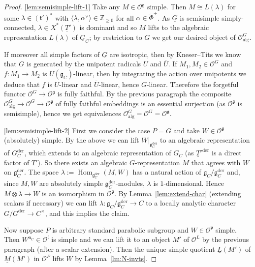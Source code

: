 \documentclass[a4paper]{amsart}
\numberwithin{equation}{section}
\theoremstyle{remark}
\theoremstyle{definition}
\DeclareMathOperator{\Hom}{Hom}
\newcommand{\Z}{\mathbb{Z}}
\newcommand{\alggrp}[1]{\underline{#1}}
\newcommand{\der}{\mathrm{der}}
\newcommand{\alg}{\mathrm{alg}}
\begin{document}
\begin{proof}
  \ref{lem:semisimple-lift-1} Take any $M \in \mathcal{O}^{\mathfrak{g}}$ simple.
  Then $M \cong L(\lambda)$ for some $\lambda \in (\mathfrak{t}')^*$ with $\langle\lambda,\alpha^{\vee}\rangle \in \Z_{\ge 0}$ for all $\alpha \in \widetilde{\Phi}^{+}$.
  As $\alggrp G$ is semisimple simply-connected, $\lambda \in X^*(\alggrp{T}')$ is dominant and so $M$ lifts to the algebraic representation $L(\lambda)$
  of $\alggrp G_{C}$; by restriction to $G$ we get our desired object of $\mathcal{O}_\alg^{G}$.

  If moreover all simple factors of $\alggrp{G}$ are isotropic, then by Kneser--Tits we know that $G$ is generated by the unipotent radicals
  $U$ and $\overline{U}$. If $M_1, M_2 \in \mathcal{O}^{G}$ and $f \colon M_1 \to M_2$ is $U(\mathfrak{g}_{C})$-linear, then by integrating the action over unipotents
  we deduce that $f$ is $U$-linear and $\overline{U}$-linear, hence $G$-linear. Therefore the forgetful functor $\mathcal{O}^{G} \to \mathcal{O}^{\mathfrak{g}}$ is fully faithful.
  By the previous paragraph the composite $\mathcal{O}_\alg^{G} \to \mathcal{O}^{G} \to \mathcal{O}^{\mathfrak{g}}$ of fully faithful embeddings is an essential surjection (as $\mathcal{O}^{\mathfrak{g}}$ is semisimple), hence we get equivalences $\mathcal{O}_\alg^{G} = \mathcal{O}^{G} = \mathcal{O}^{\mathfrak{g}}$.

  \ref{lem:semisimple-lift-2} First we consider the case $P = G$ and take $W \in \mathcal{O}^{\mathfrak{g}}$ (absolutely) simple.
  By the above we can lift $W|_{\mathfrak{g}_{C}^{\der}}$ to an algebraic representation of $G_{C}^{\der}$,
  which extends to an algebraic representation of $G_{C}$ (as $\alggrp{T}'^{\der}$ is a direct factor of $\alggrp{T}'$). So there exists an algebraic
  $G$-representation $M$ that agrees with $W$ on $\mathfrak{g}_{C}^{\der}$.
  The space $\lambda := \Hom_{\mathfrak{g}_C^{\der}}(M,W)$ has a natural action of $\mathfrak{g}_C/\mathfrak{g}_C^{\der}$ and, since $M,W$ are absolutely simple $\mathfrak{g}_C^{\der}$-modules, $\lambda$ is $1$-dimensional.
  Hence $M\otimes \lambda\to W$ is an isomorphism in $\mathcal{O}^{\mathfrak{g}}$.
  By Lemma~\ref{lem:extend-char} (extending scalars if necessary) we can lift $\lambda \colon \mathfrak{g}_{C}/\mathfrak{g}_{C}^{\der} \to C$ to a locally analytic character $G/G^{\der} \to C^{\times}$, 
  and this implies the claim.
  
  Now suppose $P$ is arbitrary standard parabolic subgroup and $W \in \mathcal{O}^{\mathfrak{p}}$ simple. Then $W^{\mathfrak{n}_C} \in \mathcal{O}^{\mathfrak{l}}$ is simple and we can lift it to an object $M'$ of $\mathcal{O}^{L}$ by the previous paragraph
  (after a scalar extension).
  Then the unique simple quotient $\underline{L}(M')$ of $\underline{M}(M')$ in $\mathcal{O}^{P}$ lifts $W$ by Lemma~\ref{lm:N-invts}.
  

\end{proof}
\end{document}
